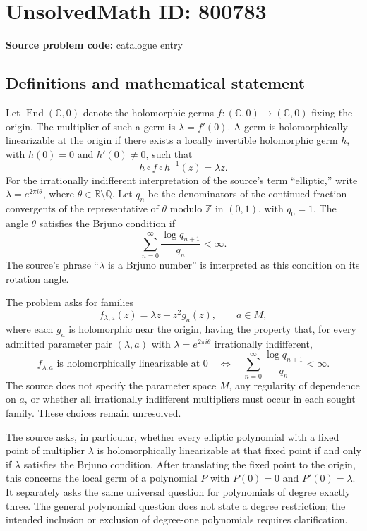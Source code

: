 \documentclass[11pt]{article}
\newcommand{\Z}{\mathbb{Z}}
\newcommand{\Q}{\mathbb{Q}}
\newcommand{\R}{\mathbb{R}}
\newcommand{\C}{\mathbb{C}}
\begin{document}
\section*{UnsolvedMath ID: 800783}
\textbf{Source problem code:} catalogue entry
\subsection{Definitions and mathematical statement}
Let \(\operatorname{End}(\C,0)\) denote the holomorphic germs \(f:(\C,0)\to(\C,0)\) fixing the origin. The multiplier of such a germ is \(\lambda=f'(0)\). A germ is holomorphically linearizable at the origin if there exists a locally invertible holomorphic germ \(h\), with \(h(0)=0\) and \(h'(0)\ne0\), such that
\[
h\circ f\circ h^{-1}(z)=\lambda z.
\]
For the irrationally indifferent interpretation of the source's term ``elliptic,'' write \(\lambda=e^{2\pi i\theta}\), where \(\theta\in\R\setminus\Q\). Let \(q_n\) be the denominators of the continued-fraction convergents of the representative of \(\theta\) modulo \(\Z\) in \((0,1)\), with \(q_0=1\). The angle \(\theta\) satisfies the Brjuno condition if
\[
\sum_{n=0}^{\infty}\frac{\log q_{n+1}}{q_n}<\infty.
\]
The source's phrase ``\(\lambda\) is a Brjuno number'' is interpreted as this condition on its rotation angle.

The problem asks for families
\[
f_{\lambda,a}(z)=\lambda z+z^2g_a(z),\qquad a\in M,
\]
where each \(g_a\) is holomorphic near the origin, having the property that, for every admitted parameter pair \((\lambda,a)\) with \(\lambda=e^{2\pi i\theta}\) irrationally indifferent,
\[
f_{\lambda,a}\text{ is holomorphically linearizable at }0
\quad\Longleftrightarrow\quad
\sum_{n=0}^{\infty}\frac{\log q_{n+1}}{q_n}<\infty.
\]
The source does not specify the parameter space \(M\), any regularity of dependence on \(a\), or whether all irrationally indifferent multipliers must occur in each sought family. These choices remain unresolved.

The source asks, in particular, whether every elliptic polynomial with a fixed point of multiplier \(\lambda\) is holomorphically linearizable at that fixed point if and only if \(\lambda\) satisfies the Brjuno condition. After translating the fixed point to the origin, this concerns the local germ of a polynomial \(P\) with \(P(0)=0\) and \(P'(0)=\lambda\). It separately asks the same universal question for polynomials of degree exactly three. The general polynomial question does not state a degree restriction; the intended inclusion or exclusion of degree-one polynomials requires clarification.
\end{document}

